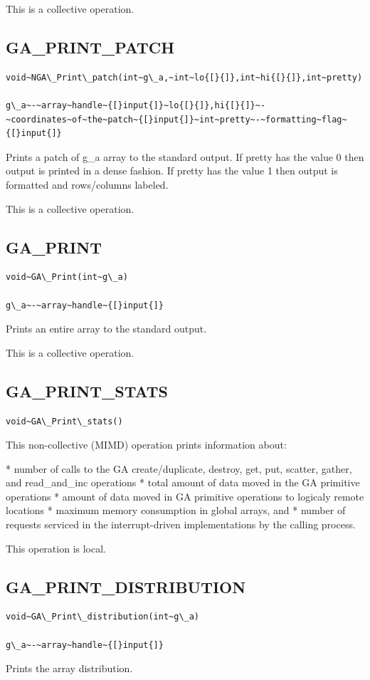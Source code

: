 This is a collective operation. 


\subsection*{\label{sub:GA_PRINT_PATCH}GA\_PRINT\_PATCH}
\begin{verbatim}
void~NGA\_Print\_patch(int~g\_a,~int~lo{[}{]},int~hi{[}{]},int~pretty)

g\_a~-~array~handle~{[}input{]}~lo{[}{]},hi{[}{]}~-~coordinates~of~the~patch~{[}input{]}~int~pretty~-~formatting~flag~{[}input{]}
\end{verbatim}
Prints a patch of g\_a array to the standard output. If pretty has
the value 0 then output is printed in a dense fashion. If pretty has
the value 1 then output is formatted and rows/columns labeled.

This is a collective operation.


\subsection*{\label{sub:GA_PRINT}GA\_PRINT}
\begin{verbatim}
void~GA\_Print(int~g\_a)

g\_a~-~array~handle~{[}input{]}
\end{verbatim}
Prints an entire array to the standard output.

This is a collective operation. 


\subsection*{\label{sub:GA_PRINT_STATS}GA\_PRINT\_STATS}
\begin{verbatim}
void~GA\_Print\_stats()
\end{verbatim}
This non-collective (MIMD) operation prints information about:

{*} number of calls to the GA create/duplicate, destroy, get, put,
scatter, gather, and read\_and\_inc operations {*} total amount of
data moved in the GA primitive operations {*} amount of data moved
in GA primitive operations to logicaly remote locations {*} maximum
memory consumption in global arrays, and {*} number of requests serviced
in the interrupt-driven implementations by the calling process.

This operation is local.


\subsection*{\label{sub:GA_PRINT_DISTRIBUTION}GA\_PRINT\_DISTRIBUTION}
\begin{verbatim}
void~GA\_Print\_distribution(int~g\_a)

g\_a~-~array~handle~{[}input{]}
\end{verbatim}
Prints the array distribution.

